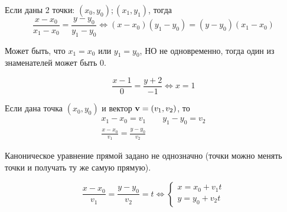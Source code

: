 \documentclass[main]{subfiles}
\begin{document}
\begin{definition}
    Если даны 2 точки: $(x_0, y_0); (x_1, y_1)$, тогда
    \[\frac{x-x_0}{x_1-x_0}= \frac{y-y_0}{y_1-y_0} \Leftrightarrow
        (x-x_0)(y_1-y_0) = (y-y_0)(x_1-x_0)\]
\end{definition}
\begin{remark}
    Может быть, что $x_1=x_0$ или $y_1 = y_0$, НО не одновременно,
    тогда один из знаменателей может быть $0$.
\end{remark}
\begin{example}
    \[\frac{x-1}{0}=\frac{y+2}{-1}\Leftrightarrow x = 1\]
\end{example}

\begin{definition}
    Если дана точка $(x_0, y_0)$ и вектор $\mathbf{v} = (v_1, v_2)$, то
    \begin{gather*}
        x_1-x_0=v_1 \qquad y_1 -y_0 = v_2\\
        \frac{x-x_0}{v_1}=\frac{y-y_0}{v_2}
    \end{gather*}
    \begin{center}
    \end{center}
\end{definition}
\begin{remark}
    Каноническое уравнение прямой задано не однозначно
    (точки можно менять точки и получать ту же самую прямую).
\end{remark}

\begin{definition}
    \[
        \frac{x-x_0}{v_1}=\frac{y-y_0}{v_2} = t \Leftrightarrow
        \begin{cases}
            x = x_0 + v_1 t \\
            y = y_0 + v_2 t
        \end{cases}
    \]
\end{definition}
\end{document}
